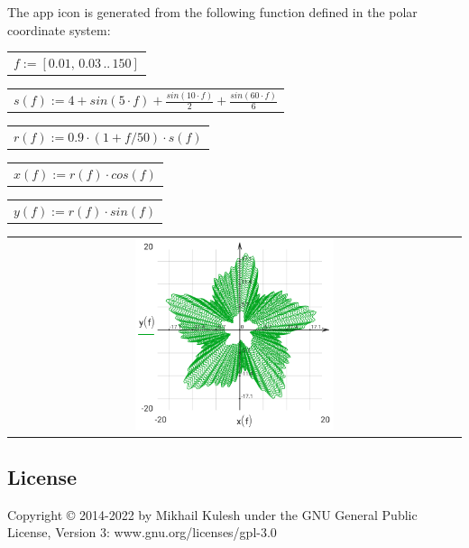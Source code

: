 \documentclass[DIV=calc, paper=a4, fontsize=11pt, twocolumn]{scrartcl}
\begin{document}
The app icon is generated from the
following function defined in the
polar coordinate system:
\begin{center}\begin{tabular}{c}
                $f := \left[ 0.01,\, 0.03 \,..\, 150 \right]$
\end{tabular}\end{center}
\begin{center}\begin{tabular}{c}
                $s(f) := 4 + sin \left( 5 \cdot f\right)  + \frac{sin \left( 10 \cdot f\right) }{2} + \frac{sin \left( 60 \cdot f\right) }{6}$
\end{tabular}\end{center}
\begin{center}\begin{tabular}{c}
                $r(f) := 0.9 \cdot \left( 1 + f / 50 \right) \cdot s \left( f\right) $
\end{tabular}\end{center}
\begin{center}\begin{tabular}{c}
                $x(f) := r \left( f\right)  \cdot cos \left( f\right) $
\end{tabular}\end{center}
\begin{center}\begin{tabular}{c}
                $y(f) := r \left( f\right)  \cdot sin \left( f\right) $
\end{tabular}\end{center}
\begin{center}\begin{tabular}{c} \includegraphics[width=0.45\textwidth]{graphics/about_micromath_fig1.png} \end{tabular}\end{center}

\subsection*{License}

Copyright © 2014-2022 by Mikhail Kulesh
under the GNU General Public License,
Version 3:
www.gnu.org/licenses/gpl-3.0
\end{document}

